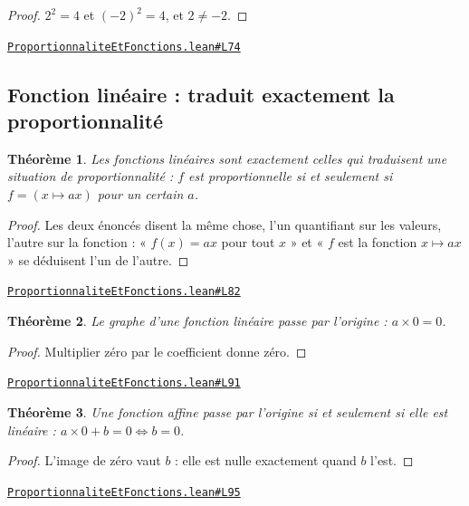 \documentclass[11pt,a4paper]{article}
\theoremstyle{definition}
\theoremstyle{plain}
\newtheorem{theoreme}{Théorème}
\newcommand{\source}[2]{\par\smallskip\noindent\hfill{\footnotesize\href{#1}{\texttt{#2}}}\par\smallskip}
\begin{document}
\begin{proof}
$2^2 = 4$ et $(-2)^2 = 4$, et $2 \ne -2$.
\end{proof}
\source{https://github.com/Commutator-IO/learn-lean/blob/main/cours/01-college/05-proportionnalite-et-fonctions/ProportionnaliteEtFonctions.lean\#L74}{ProportionnaliteEtFonctions.lean\#L74}

\subsection{Fonction linéaire : traduit exactement la proportionnalité}

\begin{theoreme}
Les fonctions linéaires sont exactement celles qui traduisent une situation de
proportionnalité : $f$ est proportionnelle si et seulement si $f = (x \mapsto ax)$ pour un
certain $a$.
\end{theoreme}

\begin{proof}
Les deux énoncés disent la même chose, l'un quantifiant sur les valeurs, l'autre sur la
fonction : « $f(x) = ax$ pour tout $x$ » et « $f$ est la fonction $x \mapsto ax$ » se
déduisent l'un de l'autre.
\end{proof}
\source{https://github.com/Commutator-IO/learn-lean/blob/main/cours/01-college/05-proportionnalite-et-fonctions/ProportionnaliteEtFonctions.lean\#L82}{ProportionnaliteEtFonctions.lean\#L82}

\begin{theoreme}
Le graphe d'une fonction linéaire passe par l'origine : $a \times 0 = 0$.
\end{theoreme}

\begin{proof}
Multiplier zéro par le coefficient donne zéro.
\end{proof}
\source{https://github.com/Commutator-IO/learn-lean/blob/main/cours/01-college/05-proportionnalite-et-fonctions/ProportionnaliteEtFonctions.lean\#L91}{ProportionnaliteEtFonctions.lean\#L91}

\begin{theoreme}
Une fonction affine passe par l'origine si et seulement si elle est linéaire :
$a \times 0 + b = 0 \iff b = 0$.
\end{theoreme}

\begin{proof}
L'image de zéro vaut $b$ : elle est nulle exactement quand $b$ l'est.
\end{proof}
\source{https://github.com/Commutator-IO/learn-lean/blob/main/cours/01-college/05-proportionnalite-et-fonctions/ProportionnaliteEtFonctions.lean\#L95}{ProportionnaliteEtFonctions.lean\#L95}
\end{document}
